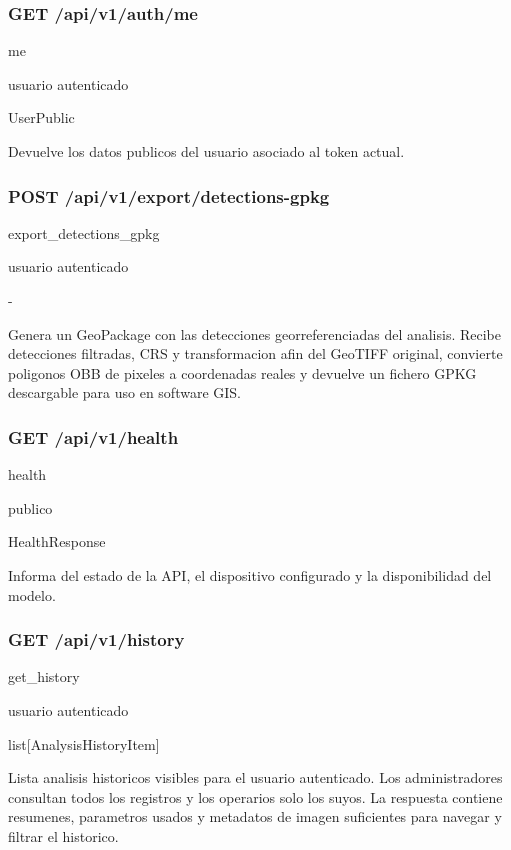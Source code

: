 \subsubsection*{GET /api/v1/auth/me}
\begin{description}[leftmargin=2.8cm,style=nextline]
\item[Handler] me
\item[Acceso] usuario autenticado
\item[Respuesta] UserPublic
\end{description}
Devuelve los datos publicos del usuario asociado al token actual.


\subsubsection*{POST /api/v1/export/detections-gpkg}
\begin{description}[leftmargin=2.8cm,style=nextline]
\item[Handler] export\_detections\_gpkg
\item[Acceso] usuario autenticado
\item[Respuesta] -
\end{description}
Genera un GeoPackage con las detecciones georreferenciadas del analisis. Recibe detecciones filtradas, CRS y transformacion afin del GeoTIFF original, convierte poligonos OBB de pixeles a coordenadas reales y devuelve un fichero GPKG descargable para uso en software GIS.


\subsubsection*{GET /api/v1/health}
\begin{description}[leftmargin=2.8cm,style=nextline]
\item[Handler] health
\item[Acceso] publico
\item[Respuesta] HealthResponse
\end{description}
Informa del estado de la API, el dispositivo configurado y la disponibilidad del modelo.


\subsubsection*{GET /api/v1/history}
\begin{description}[leftmargin=2.8cm,style=nextline]
\item[Handler] get\_history
\item[Acceso] usuario autenticado
\item[Respuesta] list[AnalysisHistoryItem]
\end{description}
Lista analisis historicos visibles para el usuario autenticado. Los administradores consultan todos los registros y los operarios solo los suyos. La respuesta contiene resumenes, parametros usados y metadatos de imagen suficientes para navegar y filtrar el historico.


